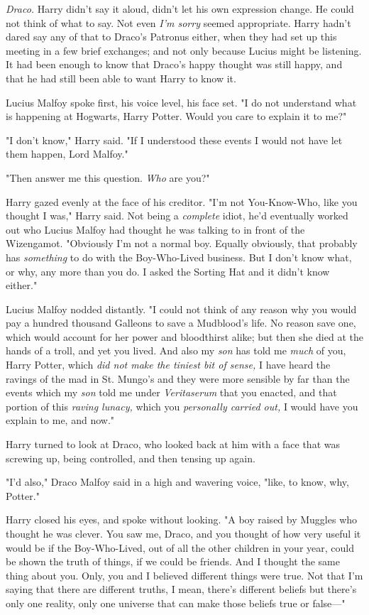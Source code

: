 \emph{Draco.} Harry didn't say it aloud, didn't let his own expression change.
He could not think of what to say. Not even \emph{I'm sorry} seemed
appropriate. Harry hadn't dared say any of that to Draco's Patronus either,
when they had set up this meeting in a few brief exchanges; and not only
because Lucius might be listening. It had been enough to know that Draco's
happy thought was still happy, and that he had still been able to want Harry to
know it.

Lucius Malfoy spoke first, his voice level, his face set. "I do not understand
what is happening at Hogwarts, Harry Potter. Would you care to explain it to
me?"

"I don't know," Harry said. "If I understood these events I would not have let
them happen, Lord Malfoy."

"Then answer me this question. \emph{Who} are you?"

Harry gazed evenly at the face of his creditor. "I'm not You-Know-Who, like you
thought I was," Harry said. Not being a \emph{complete} idiot, he'd eventually
worked out who Lucius Malfoy had thought he was talking to in front of the
Wizengamot. "Obviously I'm not a normal boy. Equally obviously, that probably
has \emph{something} to do with the Boy-Who-Lived business. But I don't know
what, or why, any more than you do. I asked the Sorting Hat and it didn't know
either."

Lucius Malfoy nodded distantly. "I could not think of any reason why you would
pay a hundred thousand Galleons to save a Mudblood's life. No reason save one,
which would account for her power and bloodthirst alike; but then she died at
the hands of a troll, and yet you lived. And also my \emph{son} has told me
\emph{much} of you, Harry Potter, which \emph{did not make the tiniest bit of
sense,} I have heard the ravings of the mad in St. Mungo's and they were more
sensible by far than the events which my \emph{son} told me under
\emph{Veritaserum} that you enacted, and that portion of this \emph{raving
lunacy,} which you \emph{personally carried out,} I would have you explain to
me, and now."

Harry turned to look at Draco, who looked back at him with a face that was
screwing up, being controlled, and then tensing up again.

"I'd also," Draco Malfoy said in a high and wavering voice, "like, to know,
why, Potter."

Harry closed his eyes, and spoke without looking. "A boy raised by Muggles who
thought he was clever. You saw me, Draco, and you thought of how very useful it
would be if the Boy-Who-Lived, out of all the other children in your year,
could be shown the truth of things, if we could be friends. And I thought the
same thing about you. Only, you and I believed different things were true. Not
that I'm saying that there are different truths, I mean, there's different
beliefs but there's only one reality, only one universe that can make those
beliefs true or false---"

